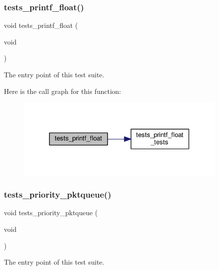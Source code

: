 \subsubsection{\texorpdfstring{tests\+\_\+printf\+\_\+float()}{tests\_printf\_float()}}
{\footnotesize\ttfamily void tests\+\_\+printf\+\_\+float (\begin{DoxyParamCaption}\item[{void}]{ }\end{DoxyParamCaption})}



The entry point of this test suite. 

Here is the call graph for this function\+:
\nopagebreak
\begin{figure}[H]
\begin{center}
\leavevmode
\includegraphics[width=294pt]{group__unittests_ga931f7ea19ee04d7b42dd1adb0f8ad87a_cgraph}
\end{center}
\end{figure}
\mbox{\label{group__unittests_gab6133c9a0e70affe6b5a5267478e6d9d}} 
\subsubsection{\texorpdfstring{tests\+\_\+priority\+\_\+pktqueue()}{tests\_priority\_pktqueue()}}
{\footnotesize\ttfamily void tests\+\_\+priority\+\_\+pktqueue (\begin{DoxyParamCaption}\item[{void}]{ }\end{DoxyParamCaption})}



The entry point of this test suite. 

